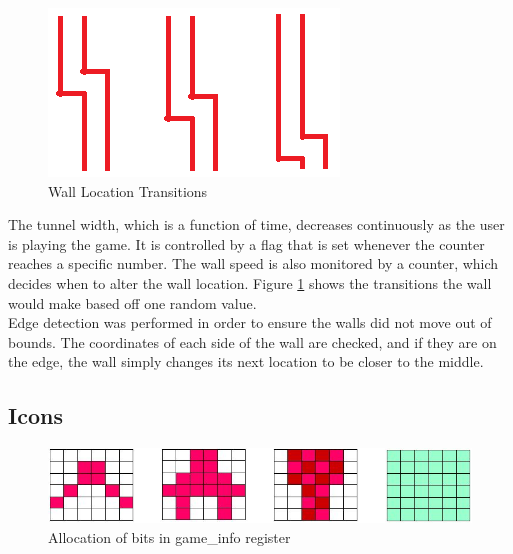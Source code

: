 \documentclass[11pt]{article}
\begin{document}
	\begin{figure}[h]\centering
	\includegraphics[height=0.3\textwidth]{Images/wall.png}
	\caption{Wall Location Transitions}
		\label{wall}
	\end{figure}

\hspace{12pt} The tunnel width, which is a function of time, decreases continuously as the user is playing the game. 
It is controlled by a flag that is set whenever the counter reaches a specific number. The wall speed is also monitored by a counter, which decides when to alter the wall location.  Figure \ref{wall} shows the transitions the wall would make based off one random value. \\

\hspace{12pt} Edge detection was performed in order to ensure the walls did not move out of bounds.  The coordinates of each side of the wall are checked, and if they are on the edge, the wall simply changes its next location to be closer to the middle.  \\
	
\subsection{Icons}

		\begin{figure}[h]\centering
		  \includegraphics[width=.7\textwidth]{Images/icons.png}
		  \caption{Allocation of bits in game\_info register}
		  \label{game_info_bits}
		\end{figure}	
\end{document}
